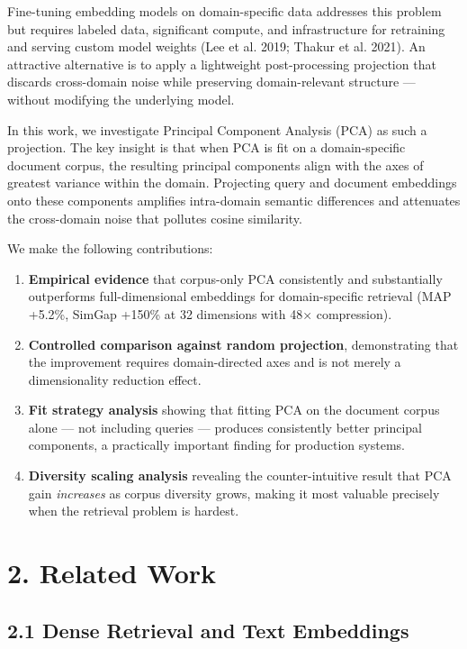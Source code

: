 \documentclass[
  11pt,
  letterpaper,
]{article}
\providecommand{\tightlist}{%
  \setlength{\itemsep}{0pt}\setlength{\parskip}{0pt}}
\begin{document}
Fine-tuning embedding models on domain-specific data addresses this
problem but requires labeled data, significant compute, and
infrastructure for retraining and serving custom model weights (Lee et
al. 2019; Thakur et al. 2021). An attractive alternative is to apply a
lightweight post-processing projection that discards cross-domain noise
while preserving domain-relevant structure --- without modifying the
underlying model.

In this work, we investigate Principal Component Analysis (PCA) as such
a projection. The key insight is that when PCA is fit on a
domain-specific document corpus, the resulting principal components
align with the axes of greatest variance within the domain. Projecting
query and document embeddings onto these components amplifies
intra-domain semantic differences and attenuates the cross-domain noise
that pollutes cosine similarity.

We make the following contributions:

\begin{enumerate}
\def\labelenumi{\arabic{enumi}.}
\tightlist
\item
  \textbf{Empirical evidence} that corpus-only PCA consistently and
  substantially outperforms full-dimensional embeddings for
  domain-specific retrieval (MAP +5.2\%, SimGap +150\% at 32 dimensions
  with 48× compression).
\item
  \textbf{Controlled comparison against random projection},
  demonstrating that the improvement requires domain-directed axes and
  is not merely a dimensionality reduction effect.
\item
  \textbf{Fit strategy analysis} showing that fitting PCA on the
  document corpus alone --- not including queries --- produces
  consistently better principal components, a practically important
  finding for production systems.
\item
  \textbf{Diversity scaling analysis} revealing the counter-intuitive
  result that PCA gain \emph{increases} as corpus diversity grows,
  making it most valuable precisely when the retrieval problem is
  hardest.
\end{enumerate}

\section{2. Related Work}\label{related-work}

\subsection{2.1 Dense Retrieval and Text
Embeddings}\label{dense-retrieval-and-text-embeddings}
\end{document}
